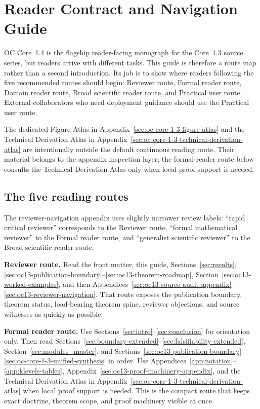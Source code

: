 \section{Reader Contract and Navigation Guide}
\label{sec:oc13-reader-contract}

OC Core~1.4 is the flagship reader-facing monograph for the Core~1.3 source
series, but readers arrive with
different tasks. This guide is therefore a route map rather than a second introduction.
Its job is to show where readers following the five recommended routes should begin:
Reviewer route, Formal reader route, Domain reader route, Broad scientific reader route, and Practical user route. External
collaborators who need deployment guidance should use the Practical user
route.

The dedicated Figure Atlas in
Appendix~\ref{sec:oc-core-1-3-figure-atlas} and the Technical Derivation Atlas
in Appendix~\ref{sec:oc-core-1-3-technical-derivation-atlas} are intentionally
outside the default continuous reading route. Their material belongs to the
appendix inspection layer; the formal-reader route below consults the
Technical Derivation Atlas only when local proof support is needed.

\subsection{The five reading routes}

The reviewer-navigation appendix uses slightly narrower review labels:
``rapid critical reviewer'' corresponds to the Reviewer route, ``formal
mathematical reviewer'' to the Formal reader route, and ``generalist
scientific reviewer'' to the Broad scientific reader route.

\textbf{Reviewer route.}
Read the front matter, this guide,
Sections~\ref{sec:results},
\ref{sec:oc13-publication-boundary}--\ref{sec:oc13-theorem-roadmap},
Section~\ref{sec:oc13-worked-examples},
and then
Appendices~\ref{sec:oc13-source-audit-appendix}--\ref{sec:oc13-reviewer-navigation}. That route exposes the publication boundary, theorem status,
load-bearing theorem spine, reviewer objections, and source witnesses as quickly
as possible.

\textbf{Formal reader route.}
Use Sections~\ref{sec:intro}--\ref{sec:conclusion} for orientation only.
Then read Sections~\ref{sec:boundary-extended}--\ref{sec:falsifiability-extended},
Section~\ref{sec:modules_master}, and
Sections~\ref{sec:oc13-publication-boundary}--\ref{sec:oc-core-1-3-unified-synthesis}
in order. Use Appendices~\ref{app:notation}--\ref{app:klevels-tables},
Appendix~\ref{sec:oc13-proof-machinery-appendix}, and the Technical
Derivation Atlas in Appendix~\ref{sec:oc-core-1-3-technical-derivation-atlas}
when local proof support is needed. This is the compact route that keeps
exact doctrine, theorem scope, and proof machinery visible at once.

